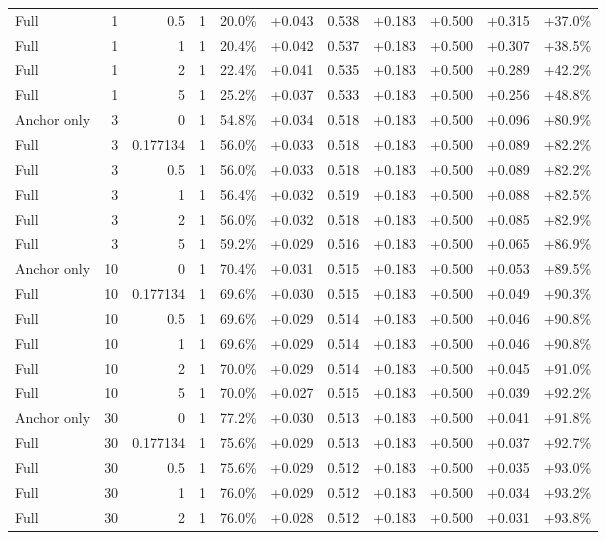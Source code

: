 \begin{table}[htbp]
\begin{tabular}{lrrrccccccc}
Full & 1 & 0.5 & 1 & 20.0\% & +0.043 & 0.538 & +0.183 & +0.500 & +0.315 & +37.0\% \\
Full & 1 & 1 & 1 & 20.4\% & +0.042 & 0.537 & +0.183 & +0.500 & +0.307 & +38.5\% \\
Full & 1 & 2 & 1 & 22.4\% & +0.041 & 0.535 & +0.183 & +0.500 & +0.289 & +42.2\% \\
Full & 1 & 5 & 1 & 25.2\% & +0.037 & 0.533 & +0.183 & +0.500 & +0.256 & +48.8\% \\
Anchor only & 3 & 0 & 1 & 54.8\% & +0.034 & 0.518 & +0.183 & +0.500 & +0.096 & +80.9\% \\
Full & 3 & 0.177134 & 1 & 56.0\% & +0.033 & 0.518 & +0.183 & +0.500 & +0.089 & +82.2\% \\
Full & 3 & 0.5 & 1 & 56.0\% & +0.033 & 0.518 & +0.183 & +0.500 & +0.089 & +82.2\% \\
Full & 3 & 1 & 1 & 56.4\% & +0.032 & 0.519 & +0.183 & +0.500 & +0.088 & +82.5\% \\
Full & 3 & 2 & 1 & 56.0\% & +0.032 & 0.518 & +0.183 & +0.500 & +0.085 & +82.9\% \\
Full & 3 & 5 & 1 & 59.2\% & +0.029 & 0.516 & +0.183 & +0.500 & +0.065 & +86.9\% \\
Anchor only & 10 & 0 & 1 & 70.4\% & +0.031 & 0.515 & +0.183 & +0.500 & +0.053 & +89.5\% \\
Full & 10 & 0.177134 & 1 & 69.6\% & +0.030 & 0.515 & +0.183 & +0.500 & +0.049 & +90.3\% \\
Full & 10 & 0.5 & 1 & 69.6\% & +0.029 & 0.514 & +0.183 & +0.500 & +0.046 & +90.8\% \\
Full & 10 & 1 & 1 & 69.6\% & +0.029 & 0.514 & +0.183 & +0.500 & +0.046 & +90.8\% \\
Full & 10 & 2 & 1 & 70.0\% & +0.029 & 0.514 & +0.183 & +0.500 & +0.045 & +91.0\% \\
Full & 10 & 5 & 1 & 70.0\% & +0.027 & 0.515 & +0.183 & +0.500 & +0.039 & +92.2\% \\
Anchor only & 30 & 0 & 1 & 77.2\% & +0.030 & 0.513 & +0.183 & +0.500 & +0.041 & +91.8\% \\
Full & 30 & 0.177134 & 1 & 75.6\% & +0.029 & 0.513 & +0.183 & +0.500 & +0.037 & +92.7\% \\
Full & 30 & 0.5 & 1 & 75.6\% & +0.029 & 0.512 & +0.183 & +0.500 & +0.035 & +93.0\% \\
Full & 30 & 1 & 1 & 76.0\% & +0.029 & 0.512 & +0.183 & +0.500 & +0.034 & +93.2\% \\
Full & 30 & 2 & 1 & 76.0\% & +0.028 & 0.512 & +0.183 & +0.500 & +0.031 & +93.8\% \\

\end{tabular}
\end{table}
